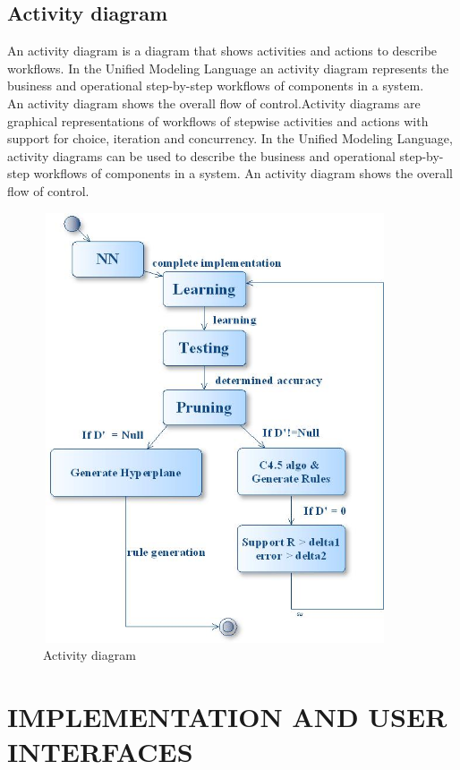 \documentclass[a4paper,14pt,onecolumn]{article}
\begin{document}
\subsection{Activity diagram}
An activity diagram is a diagram that shows activities and actions to describe workflows. In the Unified Modeling Language an activity diagram represents the business and operational step-by-step workflows of components in a system.\\ An activity diagram shows the overall flow of control.Activity diagrams are graphical representations of workflows of stepwise activities and actions with support for choice, iteration and concurrency. In the Unified Modeling Language, activity diagrams can be used to describe the business and operational step-by-step workflows of components in a system. An activity diagram shows the overall flow of control.
\begin{figure}[h!]
\begin{center}
\includegraphics[height=5in,width=4in]
{state.jpg} 
\caption{Activity diagram}
\end{center}
\end{figure}

\newpage
\section{IMPLEMENTATION AND USER INTERFACES}
\end{document}
